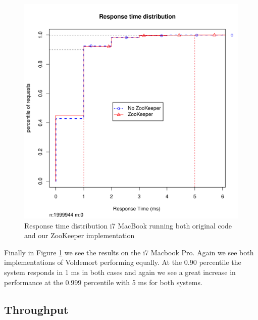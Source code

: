 \begin{figure}[h]
    \centering
    \includegraphics[width=1.0\textwidth]{results/distribution/distribution_eivind}
    \caption{Response time distribution i7 MacBook running both original code and our ZooKeeper implementation}
    \label{fig:dist_eivind}
\end{figure}

Finally in Figure \ref{fig:dist_eivind} we see the results on the i7 Macbook Pro. Again we see both implementations of Voldemort performing equally. At the 0.90 percentile the system responds in 1 ms in both cases and again we see a great increase in performance at the 0.999 percentile with 5 ms for both systems.

\subsection{Throughput}

\clearpage

